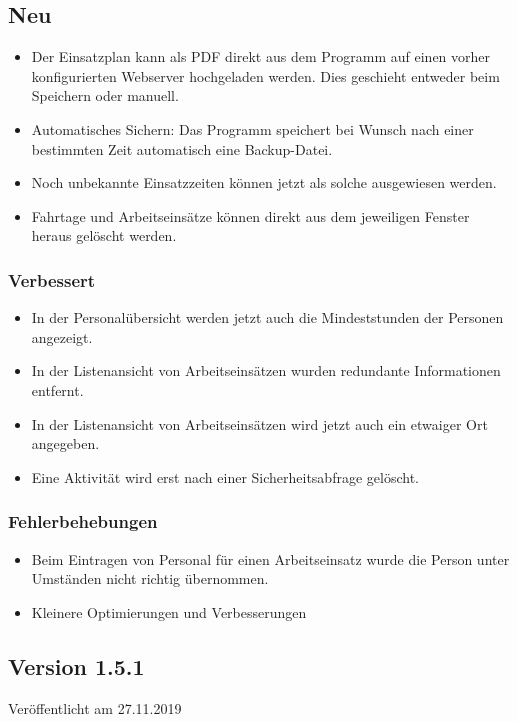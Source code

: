 \subsection{Neu}
\begin{itemize}
  \item
  Der Einsatzplan kann als PDF direkt aus dem Programm auf einen vorher konfigurierten Webserver hochgeladen werden. Dies geschieht entweder beim Speichern oder manuell.
  \item
  Automatisches Sichern: Das Programm speichert bei Wunsch nach einer bestimmten Zeit automatisch eine Backup-Datei.
  \item
  Noch unbekannte Einsatzzeiten können jetzt als solche ausgewiesen werden.
  \item
  Fahrtage und Arbeitseinsätze können direkt aus dem jeweiligen Fenster heraus gelöscht werden.
\end{itemize}

\subsubsection{Verbessert}
\begin{itemize}
  \item
  In der Personalübersicht werden jetzt auch die Mindeststunden der Personen angezeigt.
  \item
  In der Listenansicht von Arbeitseinsätzen wurden redundante Informationen entfernt.
  \item
  In der Listenansicht von Arbeitseinsätzen wird jetzt auch ein etwaiger Ort angegeben.
  \item
  Eine Aktivität wird erst nach einer Sicherheitsabfrage gelöscht.
\end{itemize}

\subsubsection{Fehlerbehebungen}
\begin{itemize}
  \item
  Beim Eintragen von Personal für einen Arbeitseinsatz wurde die Person unter Umständen nicht richtig übernommen.
  \item
  Kleinere Optimierungen und Verbesserungen
\end{itemize}


\subsection{Version 1.5.1}
Veröffentlicht am 27.11.2019

